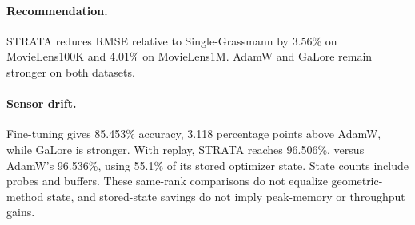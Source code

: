 \paragraph{Recommendation.} STRATA reduces RMSE relative to Single-Grassmann by 3.56\% on MovieLens100K and 4.01\% on MovieLens1M. AdamW and GaLore remain stronger on both datasets.
\paragraph{Sensor drift.} Fine-tuning gives 85.453\% accuracy, 3.118 percentage points above AdamW, while GaLore is stronger. With replay, STRATA reaches 96.506\%, versus AdamW's 96.536\%, using 55.1\% of its stored optimizer state. State counts include probes and buffers. These same-rank comparisons do not equalize geometric-method state, and stored-state savings do not imply peak-memory or throughput gains.
